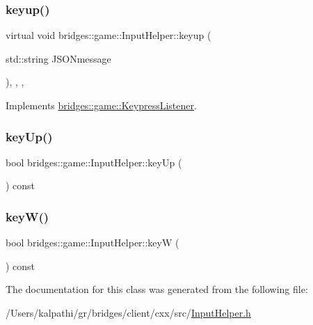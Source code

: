 \mbox{\label{classbridges_1_1game_1_1_input_helper_aa847f19c6f68ebbb63d73802abfcd9a0}} 
\subsubsection{\texorpdfstring{keyup()}{keyup()}}
{\footnotesize\ttfamily virtual void bridges\+::game\+::\+Input\+Helper\+::keyup (\begin{DoxyParamCaption}\item[{std\+::string}]{J\+S\+O\+Nmessage }\end{DoxyParamCaption})\hspace{0.3cm}{\ttfamily [inline]}, {\ttfamily [override]}, {\ttfamily [protected]}, {\ttfamily [virtual]}}



Implements \mbox{\hyperlink{classbridges_1_1game_1_1_keypress_listener_a21d9f085819e30c41f3964ea2276964d}{bridges\+::game\+::\+Keypress\+Listener}}.

\mbox{\label{classbridges_1_1game_1_1_input_helper_aaa62faebd9e874228b710bb2a57cba2b}} 
\subsubsection{\texorpdfstring{key\+Up()}{keyUp()}}
{\footnotesize\ttfamily bool bridges\+::game\+::\+Input\+Helper\+::key\+Up (\begin{DoxyParamCaption}{ }\end{DoxyParamCaption}) const\hspace{0.3cm}{\ttfamily [inline]}}

\mbox{\label{classbridges_1_1game_1_1_input_helper_a97a204c00019b28b4e95dde0b757a1aa}} 
\subsubsection{\texorpdfstring{key\+W()}{keyW()}}
{\footnotesize\ttfamily bool bridges\+::game\+::\+Input\+Helper\+::keyW (\begin{DoxyParamCaption}{ }\end{DoxyParamCaption}) const\hspace{0.3cm}{\ttfamily [inline]}}



The documentation for this class was generated from the following file\+:\begin{DoxyCompactItemize}
\item 
/\+Users/kalpathi/gr/bridges/client/cxx/src/\mbox{\hyperlink{_input_helper_8h}{Input\+Helper.\+h}}\end{DoxyCompactItemize}
